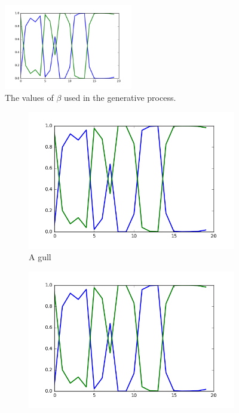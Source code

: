 \documentclass[12pt]{article}
\begin{document}
\begin{figure}[H]
  \centering
  \includegraphics[width=0.5\textwidth]{var-init-10_var-prop-5_iter-500}
  \caption{The values of $\beta$ used in the generative process.}
  \label{fig:a}
\end{figure}
\begin{figure}[H]
        \begin{subfigure}[b]{0.33\textwidth}
                \includegraphics[width=\linewidth]{var-init-10_var-prop-5_iter-500}
                \caption{A gull}
                \label{fig:gull}
        \end{subfigure}%
        \begin{subfigure}[b]{0.33\textwidth}
                \includegraphics[width=\linewidth]{var-init-10_var-prop-5_iter-500}

\end{subfigure}
\end{figure}
\end{document}

